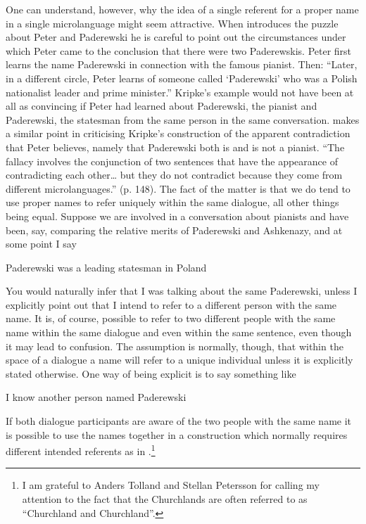 One can understand, however, why the idea of a single referent for
a proper name in a single microlanguage might seem attractive.  When
\cite{Kripke1979} introduces the puzzle about Peter and Paderewski he
is careful to point out the circumstances under which Peter came to
the conclusion that there were two Paderewskis.  Peter first learns
the name Paderewski in connection with the famous pianist.  Then:
``Later, in a different circle, Peter learns of someone called
`Paderewski' who was a Polish nationalist leader and prime minister.''
Kripke's example would not have been at all as convincing if Peter had
learned about Paderewski, the pianist and Paderewski, the statesman
from the same person in the same conversation.  \cite{Ludlow2014} makes a similar
point in criticising Kripke's construction of the apparent
contradiction that Peter believes, namely that Paderewski both is and
is not a pianist.  ``The fallacy involves the conjunction of two
sentences that have the appearance of contradicting each other\ldots
but they do not contradict because they come from different
microlanguages.'' (p. 148).  The fact of the matter is that we do tend
to use proper names to refer uniquely within the same dialogue, all
other things being equal.  Suppose we are involved in a conversation about
pianists and have been, say, comparing the relative merits of
Paderewski and Ashkenazy, and at some point I say \nexteg{}
\begin{ex} 
Paderewski was a
leading statesman in Poland 
\end{ex} 
You would naturally infer that I was
talking about the same Paderewski, unless I explicitly point out that
I intend to refer to a different person with the same name.   It
is, of course, possible to refer to two different people with the same
name within the same dialogue and even within the same sentence, even
though it may lead to confusion.  The assumption is normally, though,
that within the space of a dialogue a name will refer to a unique
individual unless it is explicitly stated otherwise.  One way of being
explicit is to say something like \nexteg{}
\begin{ex} 
I know another person named
Paderewski 
\end{ex} 
If both dialogue participants are aware of the two
people with the same name it is possible to use the names together in
a construction which normally requires different intended referents as
in \nexteg{}.\footnote{I am
  grateful to Anders Tolland and Stellan Petersson for calling my
  attention to the fact that the Churchlands are often referred to as
  ``Churchland and Churchland''.}
